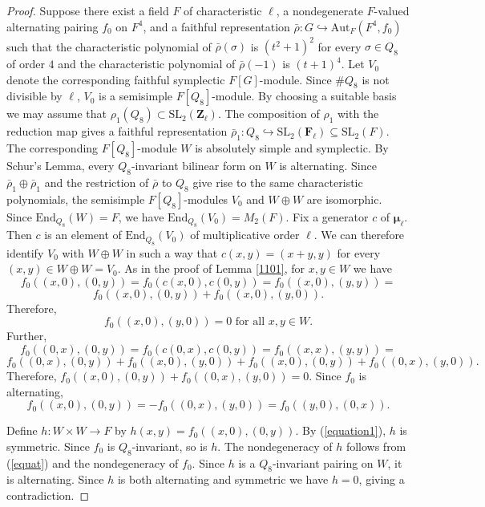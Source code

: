 \documentclass{amsart}
\def\Z{{\mathbf Z}}
\def\F{{\mathbf F}}
\def\f{{\tilde F}}
\def\End{\mathrm{End}}
\def\Aut{\mathrm{Aut}}
\def\SL{\mathrm{SL}}
\def\FF{F}
\def\f{f}
\def\g{h}
\def\bmu{\boldsymbol \mu}
\theoremstyle{definition}
\begin{document}
\begin{proof}
Suppose there exist a field $\FF$ of characteristic $\ell$,
a nondegenerate $\FF$-valued
alternating pairing ${\f_0}$ on $\FF^4$, and a
faithful representation
${\bar \rho} : G \hookrightarrow \Aut_\FF(\FF^4,\f_0)$
such that the characteristic polynomial  
of ${\bar \rho}(\sigma)$ is $(t^2+1)^2$ for every 
$\sigma\in Q_8$ of order $4$ and
the characteristic polynomial of ${\bar \rho}(-1)$ is
$(t+1)^4$. 
Let $V_0$ 
denote the corresponding faithful symplectic $F[G]$-module.
Since $\#Q_8$ is not divisible by $\ell$,
$V_0$ is a semisimple $F[Q_8]$-module.
By choosing a suitable basis we may assume that
$\rho_1(Q_8) \subset \SL_2(\Z_\ell)$.
The composition of $\rho_1$ with the reduction map gives 
a faithful representation
${\bar \rho}_1 : Q_8 \hookrightarrow \SL_2(\F_\ell)
\subseteq \SL_2(\FF)$.
The corresponding $\FF[Q_8]$-module $W$
is absolutely simple and symplectic.
By Schur's Lemma, every $Q_8$-invariant bilinear form
on $W$ is alternating. 
Since ${\bar \rho}_1 \oplus {\bar \rho}_1$ and the
restriction of ${\bar \rho}$ to $Q_8$ 
give rise to the same characteristic polynomials, 
the semisimple $F[Q_8]$-modules 
$V_0$ and $W \oplus W$ are isomorphic.
Since $\End_{Q_8}(W)=F$, we have $\End_{Q_8}(V_0)=M_2(F)$.
Fix a generator $c$ of $\bmu_\ell$. Then $c$ is an element
of $\End_{Q_8}(V_0)$ of multiplicative order $\ell$. 
We can therefore identify $V_0$ with 
$W \oplus W$ in such a way that
$c(x,y) = (x+y,y)$ for every $(x, y) \in W \oplus W = V_0$.
As in the proof of Lemma \ref{1101}, for $x, y \in W$ we have 
$${{\f}_0}((x,0),(0,y)) = {{\f}_0}(c(x,0),c(0,y)) = 
{{\f}_0}((x,0),(y,y)) = $$
$${{\f}_0}((x,0),(0,y)) + {{\f}_0}((x,0),(y,0)).$$
Therefore, 
\begin{equation}
\label{equat}
{{\f}_0}((x,0),(y,0)) = 0 \text{ for all }  x, y \in W.
\end{equation}
Further,
$${{\f}_0}((0,x),(0,y)) = {{\f}_0}(c(0,x),c(0,y)) = 
{{\f}_0}((x,x),(y,y)) = $$
$${{\f}_0}((0,x),(0,y)) + {{\f}_0}((x,0),(y,0)) 
+ {{\f}_0}((x,0),(0,y)) + {{\f}_0}((0,x),(y,0)).$$
Therefore,
${{\f}_0}((x,0),(0,y)) + {{\f}_0}((0,x),(y,0)) = 0$.
Since ${{\f}_0}$ is alternating, 
\begin{equation}
\label{equation1}
{{\f}_0}((x,0),(0,y)) = -{{\f}_0}((0,x),(y,0)) = {{\f}_0}((y,0),(0,x)).
\end{equation}

Define $\g : W \times W \to \FF$
by $\g(x,y)={{\f}_0}((x,0),(0,y))$.
By (\ref{equation1}), $\g$ is symmetric. 
Since ${{\f}_0}$ is $Q_8$-invariant, so is $\g$.
The nondegeneracy of $\g$ follows from 
(\ref{equat}) and the nondegeneracy of $f_0$.
Since $\g$ is a $Q_8$-invariant pairing on $W$, it is alternating.
Since $\g$ is both alternating and symmetric 
we have $\g=0$, giving a contradiction.
\end{proof}
\end{document}
